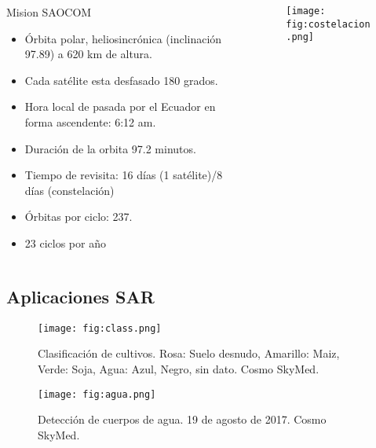 \begin{frame}{} \vskip0cm
  \begin{columns}
    \begin{column}{0.6\textwidth}
     \begin{block}{Mision SAOCOM}
\begin{itemize}
  \item Órbita polar, heliosincrónica (inclinación 97.89) a 620 km de altura.
  \item Cada satélite esta desfasado 180 grados.
  \item Hora local de pasada por el Ecuador en forma ascendente: 6:12 am.
  \item Duración de la orbita 97.2 minutos.
  \item Tiempo de revisita: 16 días (1 satélite)/8 días (constelación)
  \item Órbitas por ciclo: 237.
  \item 23 ciclos por año
\end{itemize}
     \end{block}
    \end{column}
    \begin{column}{0.4\textwidth}  %
      \begin{figure}
        \centering
        \texttt{[image: fig:costelacion.png]}
        \caption*{}
        \label{}
      \end{figure}
    \end{column}
    \end{columns}

\end{frame}

\subsection{Aplicaciones SAR}

\begin{frame}{} \vskip0cm
  \begin{figure}
    \centering
    \texttt{[image: fig:class.png]}
    \caption{Clasificación de cultivos. Rosa: Suelo desnudo, Amarillo: Maiz, Verde: Soja, Agua: Azul, Negro, sin dato. Cosmo SkyMed.}
    \label{}
  \end{figure}
\end{frame}

\begin{frame}{} \vskip0cm
  \begin{figure}
    \centering
    \texttt{[image: fig:agua.png]}
    \caption{Detección de cuerpos de agua. 19 de agosto de 2017. Cosmo SkyMed.}
    \label{}
  \end{figure}
\end{frame}

